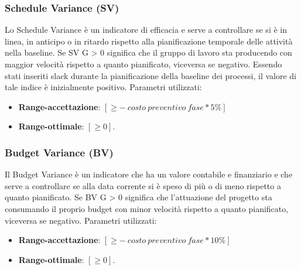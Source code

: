 \subsubsection{Schedule Variance (SV)}
Lo Schedule Variance è un indicatore di efficacia e serve a controllare se si è in linea, in anticipo o in ritardo rispetto alla pianificazione temporale delle attività nella baseline.
Se SV G > 0 significa che il gruppo di lavoro sta producendo con maggior velocità rispetto a quanto pianificato, viceversa se negativo.
Essendo stati inseriti slack durante la pianificazione della baseline dei processi, il valore di tale indice è inizialmente positivo.
Parametri utilizzati:
\begin{itemize}
	\item \textbf{Range-accettazione}: $\left[  \geq - \: costo \: preventivo \: fase * 5 \% \right]$
	\item \textbf{Range-ottimale}: $\left[\geq 0\right]$.
\end{itemize}
\subsubsection{Budget Variance (BV)}
Il Budget Variance è un indicatore che ha un valore contabile e finanziario e che serve a controllare se alla data corrente si è speso di più o di meno rispetto a quanto pianificato.
Se BV G > 0 significa che l'attuazione del progetto sta consumando il proprio budget con minor velocità rispetto a quanto pianificato, viceversa se negativo.
Parametri utilizzati:
\begin{itemize}
	\item \textbf{Range-accettazione}: $\left[  \geq - \: costo \: preventivo \: fase * 10 \% \right]$
	\item \textbf{Range-ottimale}: $\left[\geq 0\right]$.
\end{itemize}

